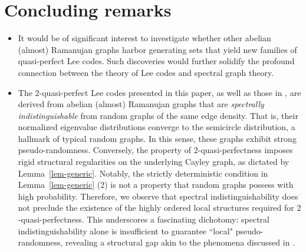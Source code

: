 \documentclass{amsart}
\numberwithin{equation}{section}
\begin{document}
\section{Concluding remarks}
\label{sect-conc}
\begin{itemize}
\item It would be of significant interest to investigate whether other abelian (almost) Ramanujan graphs harbor generating sets that yield new families of quasi-perfect Lee codes. 
Such discoveries would further solidify the profound connection between the theory of Lee codes and spectral graph theory.

\item The 2-quasi-perfect Lee codes presented in this paper, as well as those in \cite{MTQ2018}, are derived from abelian (almost) Ramanujan graphs that are {\it spectrally indistinguishable} from random graphs of the same edge density. 
That is, their normalized eigenvalue distributions converge to the semicircle distribution, a hallmark of typical random graphs. 
In this sense, these graphs exhibit strong pseudo-randomness. 
Conversely, the property of 2-quasi-perfectness imposes rigid structural regularities on the underlying Cayley graph, as dictated by Lemma~\ref{lem-generic}. 
Notably, the strictly deterministic condition in Lemma~\ref{lem-generic} (2) is not a property that random graphs possess with high probability. 
Therefore, we observe that spectral indistinguishability does not preclude the existence of the highly ordered local structures required for $2$-quasi-perfectness. 
This underscores a fascinating dichotomy: spectral indistinguishability alone is insufficient to guarantee ``local" pseudo-randomness, revealing a structural gap akin to the phenomena discussed in \cite{FFKW2025}.




\end{itemize}
\end{document}
